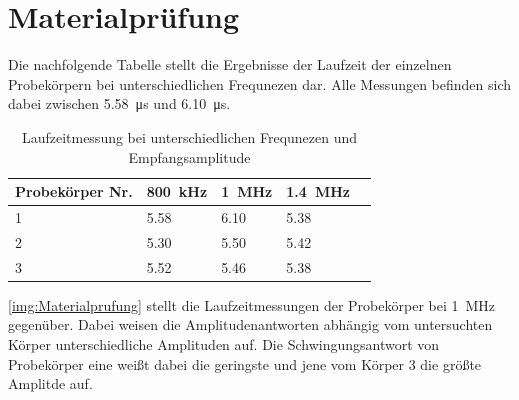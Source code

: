 \section{Materialprüfung}

Die nachfolgende Tabelle stellt die Ergebnisse der Laufzeit der einzelnen Probekörpern bei unterschiedlichen Frequnezen dar. Alle Messungen befinden sich dabei  zwischen  \SI{5.58}{\micro s} und  \SI{6.10}{\micro s}.


\begin{table}[H]
    \centering
    \begin{tabular}{l|llll}
         Probekörper Nr. &  \SI{800}{kHz} & \SI{1}{MHz} & \SI{1.4}{MHz} &  \\
         \hline
         1 & 5.58  & 6.10 & 5.38 &   \\
         2 & 5.30  & 5.50 & 5.42 &  \\
         3 & 5.52  & 5.46 & 5.38 &  
    \end{tabular}
    \caption{Laufzeitmessung bei unterschiedlichen Frequnezen und Empfangsamplitude}
    \label{tab:Materialprüfung}
\end{table}


\autoref{img:Materialprufung} stellt die Laufzeitmessungen der Probekörper bei \SI{1}{MHz} gegenüber. Dabei weisen die Amplitudenantworten abhängig vom untersuchten Körper unterschiedliche Amplituden auf. Die Schwingungsantwort von Probekörper eine weißt dabei die geringste und jene vom Körper 3 die größte Amplitde auf.


